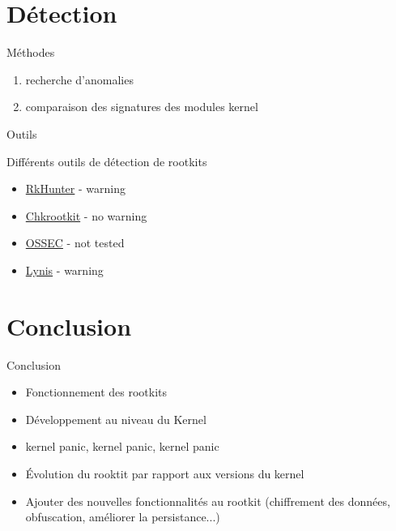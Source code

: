\documentclass[10pt]{beamer}
\begin{document}
\section{Détection}

\begin{frame}{Méthodes}
	
	\begin{enumerate}
		\item recherche d'anomalies
		\item comparaison des signatures des modules kernel
	\end{enumerate}
	

\end{frame}

\begin{frame}{Outils}
	
	Différents outils de détection de rootkits
	\begin{itemize}
		\item \href{http://rkhunter.sourceforge.net/}{RkHunter} - \alert{warning}
		\item \href{http://www.chkrootkit.org/}{Chkrootkit} - {\color[rgb]{0,0.8,0.3} no warning}
		\item \href{http://ossec.github.io/}{OSSEC}   - {\color{gray} not tested}
		\item \href{https://cisofy.com/lynis/}{Lynis} - \alert{warning}
	\end{itemize}
	
\end{frame}


\section*{Conclusion}

\begin{frame}{Conclusion}
	
	\begin{itemize}
		\item Fonctionnement des rootkits
		\item Développement au niveau du Kernel
		\item kernel panic, kernel panic, kernel panic
		\item Évolution du rooktit par rapport aux versions du kernel
		\item Ajouter des nouvelles fonctionnalités au rootkit (chiffrement des données, obfuscation, améliorer la persistance...)
		
	\end{itemize}

\end{frame}
\end{document}
